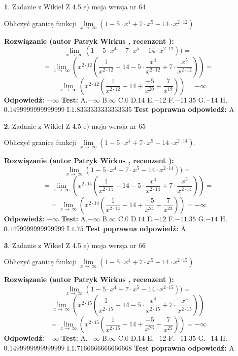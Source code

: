 \documentclass[12pt, a4paper]{article}
\theoremstyle{definition} %
\newtheorem{zad}{}
\newcommand{\zadStart}[1]{\begin{zad}#1\newline}
\newcommand{\zadStop}{\end{zad}}
\newcommand{\rozwStart}[2]{\noindent \textbf{Rozwiązanie (autor #1 , recenzent #2): }\newline}
\newcommand{\rozwStop}{\newline}
\newcommand{\odpStart}{\noindent \textbf{Odpowiedź:}\newline}
\newcommand{\odpStop}{\newline}
\newcommand{\testStart}{\noindent \textbf{Test:}\newline}
\newcommand{\testStop}{\newline}
\newcommand{\kluczStart}{\noindent \textbf{Test poprawna odpowiedź:}\newline}
\newcommand{\kluczStop}{\newline}
\begin{document}
\zadStart{Zadanie z Wikieł Z 4.5 e) moja wersja nr 64}


Obliczyć granicę funkcji  $\lim\limits_{x\to\ \infty}(1 - 5 \cdot x^{4}+7 \cdot x^{5}- 14 \cdot x^{2\cdot12})$.
\zadStop
\rozwStart{Patryk Wirkus}{}
$$\lim\limits_{x\to\ \infty}(1 - 5 \cdot x^{4}+7 \cdot x^{5}- 14 \cdot x^{2\cdot12}))=$$
$$=\lim\limits_{x\to\ \infty}(x^{2\cdot12}(\frac{1}{x^{2\cdot12}}-14 -5 \cdot \frac{x^{4}}{x^{2\cdot12}}+7 \cdot \frac{x^{5}}{x^{2\cdot12}}))=$$
$$=\lim\limits_{x\to\ \infty}(x^{2\cdot12}(\frac{1}{x^{2\cdot12}}-14 + \frac{-5}{x^{20}}+ \frac{7}{x^{19}}))=-\infty$$
\rozwStop
\odpStart
$-\infty$
\odpStop
\testStart
A.$-\infty$ B.$\infty$ C.$0$ D.$14$ E.$-12$
F.$-11.35$ G.$-14$
H.$0.1499999999999999$
I.$1.8333333333333335$
\testStop
\kluczStart
A
\kluczStop



\zadStart{Zadanie z Wikieł Z 4.5 e) moja wersja nr 65}


Obliczyć granicę funkcji  $\lim\limits_{x\to\ \infty}(1 - 5 \cdot x^{4}+7 \cdot x^{5}- 14 \cdot x^{2\cdot14})$.
\zadStop
\rozwStart{Patryk Wirkus}{}
$$\lim\limits_{x\to\ \infty}(1 - 5 \cdot x^{4}+7 \cdot x^{5}- 14 \cdot x^{2\cdot14}))=$$
$$=\lim\limits_{x\to\ \infty}(x^{2\cdot14}(\frac{1}{x^{2\cdot14}}-14 -5 \cdot \frac{x^{4}}{x^{2\cdot14}}+7 \cdot \frac{x^{5}}{x^{2\cdot14}}))=$$
$$=\lim\limits_{x\to\ \infty}(x^{2\cdot14}(\frac{1}{x^{2\cdot14}}-14 + \frac{-5}{x^{24}}+ \frac{7}{x^{23}}))=-\infty$$
\rozwStop
\odpStart
$-\infty$
\odpStop
\testStart
A.$-\infty$ B.$\infty$ C.$0$ D.$14$ E.$-12$
F.$-11.35$ G.$-14$
H.$0.1499999999999999$
I.$1.75$
\testStop
\kluczStart
A
\kluczStop



\zadStart{Zadanie z Wikieł Z 4.5 e) moja wersja nr 66}


Obliczyć granicę funkcji  $\lim\limits_{x\to\ \infty}(1 - 5 \cdot x^{4}+7 \cdot x^{5}- 14 \cdot x^{2\cdot15})$.
\zadStop
\rozwStart{Patryk Wirkus}{}
$$\lim\limits_{x\to\ \infty}(1 - 5 \cdot x^{4}+7 \cdot x^{5}- 14 \cdot x^{2\cdot15}))=$$
$$=\lim\limits_{x\to\ \infty}(x^{2\cdot15}(\frac{1}{x^{2\cdot15}}-14 -5 \cdot \frac{x^{4}}{x^{2\cdot15}}+7 \cdot \frac{x^{5}}{x^{2\cdot15}}))=$$
$$=\lim\limits_{x\to\ \infty}(x^{2\cdot15}(\frac{1}{x^{2\cdot15}}-14 + \frac{-5}{x^{26}}+ \frac{7}{x^{25}}))=-\infty$$
\rozwStop
\odpStart
$-\infty$
\odpStop
\testStart
A.$-\infty$ B.$\infty$ C.$0$ D.$14$ E.$-12$
F.$-11.35$ G.$-14$
H.$0.1499999999999999$
I.$1.7166666666666668$
\testStop
\kluczStart
A
\kluczStop
\end{document}

